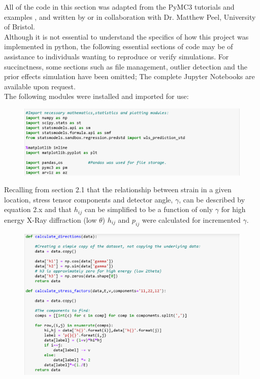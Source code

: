 All of the code in this section was adapted from the PyMC3 tutorials and examples \cite{sedar_2010_glm}, and written by or in collaboration with Dr. Matthew Peel, University of Bristol. \\

Although it is not essential to understand the specifics of how this project was implemented in python, the following essential sections of code may be of assistance to individuals wanting to reproduce or verify simulations. For succinctness, some sections such as file management, outlier detection and the prior effects simulation have been omitted; The complete Jupyter Notebooks are available upon request. \\

The following modules were installed and imported for use:

 \begin{figure}[H]
 	\centering
 	\includegraphics[width=0.8\linewidth]{chapters/chapter02/fig02/imports.png}
 \end{figure}

Recalling from section 2.1 that the relationship between strain in a given location, stress tensor components and detector angle, $\gamma$, can be described by equation 2.x and that $h_{ij}$ can be simplified to be a function of only $\gamma$ for high energy X-Ray diffraction (low $\theta$) \cite{he_2018_twodimensional} $h_{ij}$ and $p_{ij}$ were calculated for incremented $\gamma$.

 \begin{figure}[H]
 	\centering
 	\includegraphics[width=0.8\linewidth]{chapters/chapter02/fig02/findhp.png}
 \end{figure}

